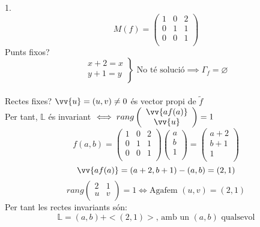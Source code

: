 \begin{exmp}1.
	\[M(f)=\left(\begin{array}{cc|c}
		1&0&2\\
		0&1&1\\ \hline
		0&0&1\\
	\end{array}\right)\]
	Punts fixos?
	\[\left.\begin{array}{r}x+2=x\\y+1=y\\\end{array}\right\}\text{ No té solució}\implies\Gamma_f=\varnothing\] \\
	Rectes fixes? $\vv{u}=(u,v)\neq 0$ és vector propi de $\widetilde{f}$ \\
	Per tant, $\mathbb{L}$ és invariant $\iff rang\left(\begin{array}{c}\vv{af(a)}\\\vv{u}\\\end{array}\right)=1$ \\
	\[f(a,b)=\left(\begin{array}{cc|c}
		1&0&2\\
		0&1&1\\ \hline
		0&0&1\\
	\end{array}\right)\left(\begin{array}{c}a\\b\\1\\\end{array}\right)=\left(\begin{array}{c}a+2\\b+1\\1\\\end{array}\right)\]
	\[\vv{af(a)}=(a+2,b+1)-(a,b)=(2,1)\]
	\[rang\left(\begin{array}{cc}2&1\\u&v\\\end{array}\right)=1\iff\text{Agafem }(u,v)=(2,1)\]
	Per tant les rectes invariants són:
	\[\mathbb{L}=(a,b)+<(2,1)>\text{, amb un }(a,b)\text{ qualsevol}\] 
\end{exmp}
